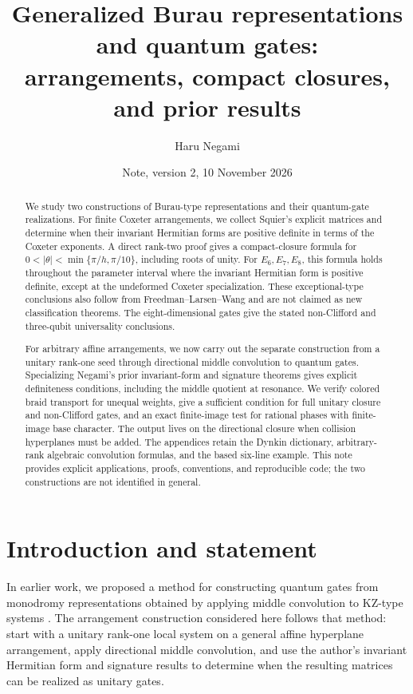 \documentclass[11pt,a4paper]{article}
\title{Generalized Burau representations and quantum gates:\\arrangements, compact closures, and prior results}
\author{Haru Negami}
\date{Note, version 2, 10 November 2026}
\theoremstyle{remark}\newtheorem{remark}[theorem]{Remark}
\begin{document}
\maketitle
\begin{abstract}
We study two constructions of Burau-type representations and their
quantum-gate realizations. For finite Coxeter arrangements, we collect
Squier's explicit matrices and determine when their invariant Hermitian
forms are positive definite in terms of the Coxeter exponents. A direct
rank-two proof gives a compact-closure formula for
$0<|\theta|<\min\{\pi/h,\pi/10\}$, including roots of unity.
For $E_6,E_7,E_8$, this formula holds throughout the parameter interval
where the invariant Hermitian form is positive definite, except at the
undeformed Coxeter specialization. These exceptional-type conclusions
also follow from Freedman--Larsen--Wang and are not claimed as new
classification theorems. The eight-dimensional gates give the stated
non-Clifford and three-qubit universality conclusions.

For arbitrary affine arrangements, we now carry out the separate
construction from a unitary rank-one seed through directional middle
convolution to quantum gates. Specializing Negami's prior invariant-form
and signature theorems gives explicit definiteness conditions, including
the middle quotient at resonance. We verify colored braid transport for
unequal weights, give a sufficient condition for full unitary closure
and non-Clifford gates, and an exact finite-image test for rational
phases with finite-image base character. The output lives on the
directional closure when collision hyperplanes must be added.
The appendices retain the Dynkin dictionary, arbitrary-rank algebraic
convolution formulas, and the based six-line example. This note provides
explicit applications, proofs, conventions, and reproducible code; the
two constructions are not identified in general.
\end{abstract}

\section{Introduction and statement}\label{sec:general-burau}
In earlier work, we proposed a method for constructing quantum gates
from monodromy representations obtained by applying middle convolution
to KZ-type systems \cite{NegamiGates,NegamiKZ}.
The arrangement construction considered here follows that method:
start with a unitary rank-one local system on a general affine hyperplane
arrangement, apply directional middle convolution, and use the author's
invariant Hermitian form and signature results
\cite{NegamiKZ,NegamiSignature} to determine when the resulting matrices
can be realized as unitary gates.
\end{document}
